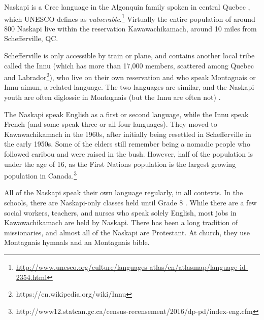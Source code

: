 
Naskapi is a Cree language in the Algonquin family spoken in central Quebec \cite{MacKenzie-and-Jancewicz-1994}, which UNESCO defines as {\it vulnerable}.\footnote{\href{http://www.unesco.org/culture/languages-atlas/en/atlasmap/language-id-2354.html}{http://www.unesco.org/culture/languages-atlas/en/atlasmap/language-id-2354.html}} Virtually the entire population of around 800 Naskapi live within the reservation Kawawachikamach, around 10 miles from Schefferville, QC.


Schefferville is only accessible by train or plane, and contains another local tribe called the Innu (which has more than 17,000 members, scattered among Quebec and Labrador\footnote{https://en.wikipedia.org/wiki/Innu}), who live on their own reservation and who speak Montagnais or Innu-aimun, a related language. The two languages are similar, and the Naskapi youth are often diglossic in Montagnais (but the Innu are often not) \cite{MacKenzie-1980}.

The Naskapi speak English as a first or second language, while the Innu speak French (and some speak three or all four languages). They moved to Kawawachikamach in the 1960s, after initially being resettled in Schefferville in the early 1950s. Some of the elders still remember being a nomadic people who followed caribou and were raised in the bush. However, half of the population is under the age of 16, as the First Nations population is the largest growing population in Canada.\footnote{http://www12.statcan.gc.ca/census-recensement/2016/dp-pd/index-eng.cfm}

All of the Naskapi speak their own language regularly, in all contexts. In the schools, there are Naskapi-only classes held until Grade 8 \cite{llewellyn2017oral}. While there are a few social workers, teachers, and nurses who speak solely English, most jobs in Kawawachikamach are held by Naskapi. There has been a long tradition of missionaries, and almost all of the Naskapi are Protestant. At church, they use Montagnais hymnals and an Montagnais bible.


